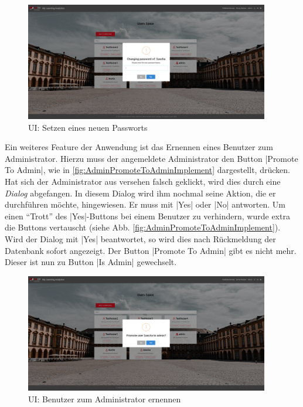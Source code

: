 \begin{figure}[hp]
	\centering
	\includegraphics[width=0.95\textwidth, keepaspectratio]{img/client/AdmiSetPasswordOfUser.png}
	\captionsetup{justification=centering, format=plain}
	\caption[\acf{UI}: Setzen eines neuen Passworts]{\acf{UI}: Setzen eines neuen Passworts \\ \quelleScreenshot}
	\label{fig:AdminSetNewPasswordImplement}
\end{figure}

Ein weiteres Feature der Anwendung ist das Ernennen eines Benutzer zum Administrator. 
Hierzu muss der angemeldete Administrator den Button \jinline|Promote To Admin|, wie in \abb \vref{fig:AdminPromoteToAdminImplement} dargestellt, drücken. 
Hat sich der Administrator aus versehen falsch geklickt, wird dies durch eine \emph{Dialog} abgefangen. 
In diesem Dialog wird ihm nochmal seine Aktion, die er durchführen möchte, hingewiesen. 
Er muss mit \jinline|Yes| oder \jinline|No| antworten. 
Um einen \enquote{Trott} des \jinline|Yes|-Buttons bei einem Benutzer zu verhindern, wurde extra die Buttons vertauscht (siehe Abb. \vref{fig:AdminPromoteToAdminImplement}).\newline
Wird der Dialog mit \jinline|Yes| beantwortet, so wird dies nach Rückmeldung der Datenbank sofort angezeigt. 
Der Button \jinline|Promote To Admin| gibt es nicht mehr. 
Dieser ist nun zu Button \jinline|Is Admin| gewechselt.

\begin{figure}[hp]
	\centering
	\includegraphics[width=0.95\textwidth, keepaspectratio]{img/client/AdminPromoteToAdmin.png}
	\captionsetup{justification=centering, format=plain}
	\caption[\acf{UI}: Benutzer zum Administrator ernennen]{\acf{UI}: Benutzer zum Administrator ernennen \\ \quelleScreenshot}
	\label{fig:AdminPromoteToAdminImplement}
\end{figure}



